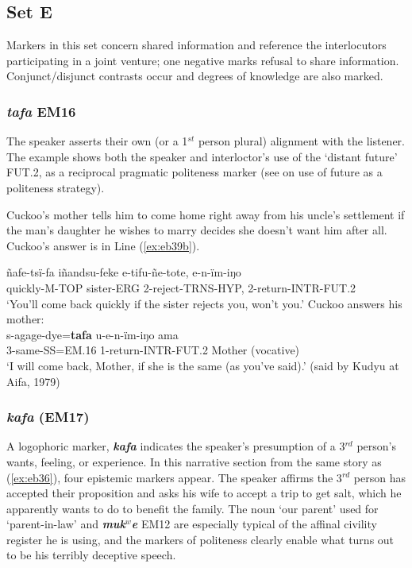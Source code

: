 \documentclass[output=paper]{langsci/langscibook}
\begin{document}
\subsection{Set E}

Markers in this set concern shared information and reference the interlocutors participating in a joint venture; one negative marks refusal to share information. Conjunct/disjunct contrasts occur and degrees of knowledge are also marked.

\subsubsection{\textit{tafa} EM16} 
The speaker asserts their own (or a 1$^{st}$ person plural) alignment with the listener. The example shows both the speaker and interloctor’s use of the ‘distant future’ FUT.2, %
as a reciprocal pragmatic politeness marker (see \citealt{Mendoza2016} on use of future as a politeness strategy). 

Cuckoo’s mother tells him to come home right away from his uncle’s settlement if the man’s  daughter he wishes to marry decides she doesn’t want him after all. Cuckoo’s answer is in Line (\ref{ex:eb39b}).

\begin{exe}
\ex \label{ex:eb39}
	\begin{xlist}
	\ex \label{ex:eb39a}
	\gll ñafe-tsï-fa iñandsu-feke e-tifu-ñe-tote, e-n-ïm-iŋo\\
	quickly-M-TOP sister-ERG 2-reject-TRNS-HYP, 2-return-INTR-FUT.2\\
	\trans ‘You’ll come back quickly if the sister rejects you, won’t you.’
	\ex Cuckoo answers his mother:\label{ex:eb39b}\\ 
	\gll s-agage-dye=\textbf{tafa} u-e-n-ïm-iŋo ama\\
	3-same-SS=EM.16 1-return-INTR-FUT.2 Mother (vocative)\\
	\trans ‘I will come back, Mother, if she is the same (as you've said).’ (said by Kudyu at Aifa, 1979)
\end{xlist}
\end{exe}

\subsubsection{\textit{kafa} (EM17)} 
A logophoric marker, \textbf{\textit{kafa}} indicates the speaker’s presumption of a 3$^{rd}$ person’s wants,  feeling, or experience.   In this narrative section from the same story as (\ref{ex:eb36}),%
four epistemic markers appear.  The speaker  affirms the 3$^{rd}$ person has accepted their proposition and asks his wife to accept a trip to get salt, which he apparently wants to do to benefit the family.  The noun ‘our parent’ used for ‘parent-in-law’ and \textbf{\textit{muk$^w$e}} EM12 are especially typical of the affinal civility register he is using, and the markers of politeness clearly enable what turns out to be his terribly deceptive speech. 
\end{document}
